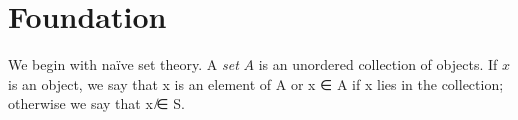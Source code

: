 
\chapter{Foundation}

We begin with na\"ive set theory. A \emph{set} $A$ is an unordered collection of objects. If $x$ is an object, we say that x is an element of A or x ∈ A if x lies in the collection; otherwise we say that x ̸∈ S. 


